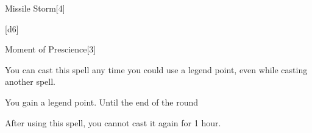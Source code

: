 \begin{spellsection}{Missile Storm}[4]
    \begin{spellheader}
    \end{spellheader}
    \begin{spellcontent}
        \begin{spelltargetinginfo}
        \end{spelltargetinginfo}
        \begin{spelleffects}
            \spelleffect {}[d6]
        \end{spelleffects}
    \end{spellcontent}
    \begin{spellfooter}
        \spellnotes \forcespellnotes
        \miscastexplode
    \end{spellfooter}
    \begin{spellaugments}
    \end{spellaugments}
\end{spellsection}

\begin{spellsection}{Moment of Prescience}[3]
    \begin{spellheader}
    \end{spellheader}
    \begin{spellcontent}
        \begin{spelltargetinginfo}
            \spellspecial You can cast this spell any time you could use a legend point, even while casting another spell.
        \end{spelltargetinginfo}
        \begin{spelleffects}
            \spelleffect You gain a legend point.
            \spelldur Until the end of the round
        \end{spelleffects}
    \end{spellcontent}
    \begin{spellfooter}
        \spellnotes After using this spell, you cannot cast it again for 1 hour.
        \miscastexplode
    \end{spellfooter}
\end{spellsection}

